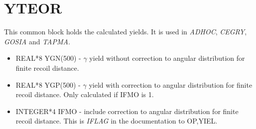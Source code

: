 \section{YTEOR}

This common block holds the calculated yields. It is used in {\em ADHOC},
{\em CEGRY}, {\em GOSIA} and {\em TAPMA}.

\begin{itemize}
\item REAL*8 YGN(500) - $\gamma$ yield without correction to angular
distribution for finite recoil distance.
\item REAL*8 YGP(500) - $\gamma$ yield with correction to angular
distribution for finite recoil distance. Only calculated if IFMO is 1.
\item INTEGER*4 IFMO - include correction to angular distribution for finite
recoil distance. This is {\em IFLAG} in the documentation to OP,YIEL.
\end{itemize}
